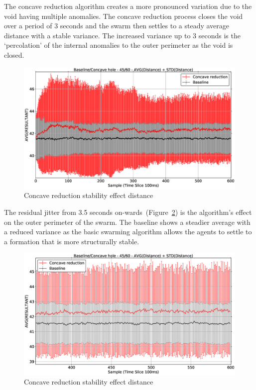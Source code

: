 The concave reduction algorithm creates a more pronounced variation due to the void having multiple anomalies. The concave reduction process closes the void over a period of 3 seconds and the swarm then settles to a steady average distance with a stable variance. The increased variance up to 3 seconds is the `percolation' of the internal anomalies to the outer perimeter as the void is closed.
\begin{figure}[H]
\begin{center}
\includegraphics[width=15cm]{CHAPTER-7/figures/ConcavePerimeter4560-DIST}
\end{center}
\caption{Concave reduction stability effect distance\label{voids:ConcavePerimeter4560-DIST}}
\end{figure}

The residual jitter from 3.5 seconds on-wards~(Figure~\ref{voids:ConcavePerimeter4560-DIST-2}) is the algorithm's effect on the outer perimeter of the swarm. The baseline shows a steadier average with a reduced variance as the basic swarming algorithm allows the agents to settle to a formation that is more structurally stable.
\begin{figure}[H]
\begin{center}
\includegraphics[width=15cm]{CHAPTER-7/figures/ConcavePerimeter4560-DIST-2}
\end{center}
\caption{Concave reduction stability effect distance\label{voids:ConcavePerimeter4560-DIST-2}}
\end{figure}

